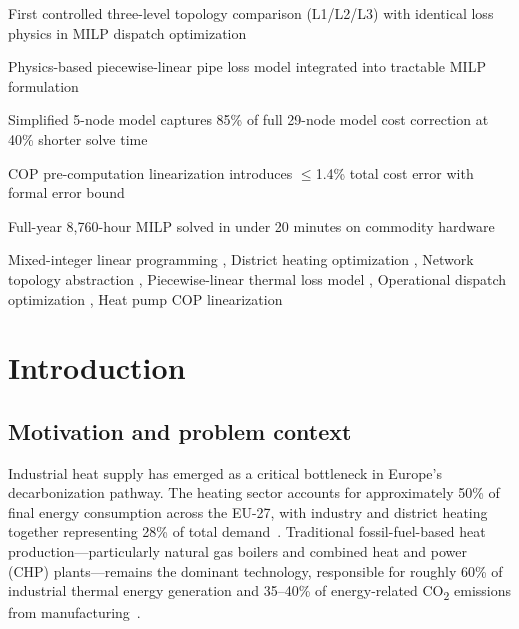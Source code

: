 \documentclass[a4paper,fleqn]{cas-dc}
\begin{document}
\begin{highlights}
\item First controlled three-level topology comparison (L1/L2/L3) with identical loss physics in MILP dispatch optimization
\item Physics-based piecewise-linear pipe loss model integrated into tractable MILP formulation
\item Simplified 5-node model captures 85\% of full 29-node model cost correction at 40\% shorter solve time
\item COP pre-computation linearization introduces $\leq$1.4\% total cost error with formal error bound
\item Full-year 8,760-hour MILP solved in under 20 minutes on commodity hardware
\end{highlights}

\begin{keywords}
Mixed-integer linear programming \sep
District heating optimization \sep
Network topology abstraction \sep
Piecewise-linear thermal loss model \sep
Operational dispatch optimization \sep
Heat pump COP linearization
\end{keywords}

\maketitle

\linenumbers


\section{Introduction}\label{sec:introduction}

\subsection{Motivation and problem context}

Industrial heat supply has emerged as a critical bottleneck in Europe's decarbonization pathway. The heating sector accounts for approximately 50\% of final energy consumption across the EU-27, with industry and district heating together representing 28\% of total demand~\citep{EC2021,IEA2022}. Traditional fossil-fuel-based heat production---particularly natural gas boilers and combined heat and power (CHP) plants---remains the dominant technology, responsible for roughly 60\% of industrial thermal energy generation and 35--40\% of energy-related CO\textsubscript{2} emissions from manufacturing~\citep{EEA2023}.
\end{document}
